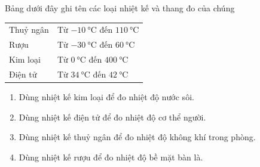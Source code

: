 \begin{ex}
	Bảng dưới đây ghi tên các loại nhiệt kế và thang đo của chúng
	\begin{center}
		\begin{tabular}{|C{5cm}|C{6cm}|}
			\hline
			 & \\
			\hline
			Thuỷ ngân & Từ $\SI{-10}{\celsius}$ đến $\SI{110}{\celsius}$\\
			\hline
			Rượu & Từ $\SI{-30}{\celsius}$ đến $\SI{60}{\celsius}$\\
			\hline
			Kim loại & Từ $\SI{0}{\celsius}$ đến $\SI{400}{\celsius}$\\
			\hline
			Điện tử & Từ $\SI{34}{\celsius}$ đến $\SI{42}{\celsius}$\\
			\hline
		\end{tabular}
	\end{center}
	\begin{enumerate}[label=\alph*)]
		\item Dùng nhiệt kế kim loại để đo nhiệt độ nước sôi.
		\item Dùng nhiệt kế điện tử để đo nhiệt độ cơ thể người.
		\item Dùng nhiệt kế thuỷ ngân để đo nhiệt độ không khí trong phòng.
		\item Dùng nhiệt kế rượu để đo nhiệt độ bề mặt bàn là.
	\end{enumerate}
	\end{ex}

